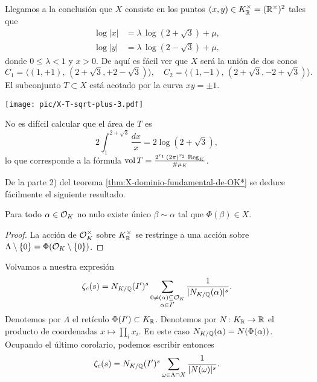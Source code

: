 \begin{ejemplo}
  \vspace{1em}

  Llegamos a la conclusión que $X$ consiste en los puntos
  $(x,y) \in K_{\mathbb{R}}^\times = (\mathbb{R}^\times)^2$ tales que
  \begin{align*}
    \log |x| & = \lambda\,\log (2 + \sqrt{3}) + \mu,\\
    \log |y| & = \lambda\,\log (2 - \sqrt{3}) + \mu,
  \end{align*}
  donde $0 \le \lambda < 1$ y $x > 0$. De aquí es fácil ver que $X$ será la
  unión de dos conos
  \[ C_1 = \langle (1,+1), \, (2 + \sqrt{3}, +2 - \sqrt{3}) \rangle, \quad
     C_2 = \langle (1,-1), \, (2 + \sqrt{3}, -2 + \sqrt{3}) \rangle. \]
  El subconjunto $T \subset X$ está acotado por la curva $xy = \pm 1$.

  \begin{center}
    \texttt{[image: pic/X-T-sqrt-plus-3.pdf]}
  \end{center}

  No es difícil calcular que el área de $T$ es
  $$2\int_1^{2 + \sqrt{3}} \frac{dx}{x} = 2\log (2 + \sqrt{3}),$$
  lo que corresponde a la fórmula
  $\operatorname{vol} T = \frac{2^{r_1}\,(2\pi)^{r_2}\,\operatorname{Reg}_K}{\#\mu_K}$.
\end{ejemplo}

De la parte 2) del teorema \ref{thm:X-dominio-fundamental-de-OK*} se deduce
fácilmente el siguiente resultado.

\begin{corolario}
  Para todo $\alpha \in \mathcal{O}_K$ no nulo existe único $\beta \sim \alpha$ tal que
  $\Phi (\beta) \in X$.

  \begin{proof}
    La acción de $\mathcal{O}_K^\times$ sobre $K_{\mathbb{R}}^\times$ se restringe a una acción
    sobre $\Lambda\setminus \{ 0 \} = \Phi (\mathcal{O}_K \setminus \{ 0 \})$.
  \end{proof}
\end{corolario}

Volvamos a nuestra expresión
$$\zeta_c (s) = N_{K/\mathbb{Q}} (I')^s \sum_{\substack{0 \ne (\alpha) \subseteq \mathcal{O}_K \\ \alpha \in I'}} \frac{1}{|N_{K/\mathbb{Q}} (\alpha)|^s}.$$
Denotemos por $\Lambda$ el retículo $\Phi (I') \subset K_{\mathbb{R}}$. Denotemos por
$N\colon K_{\mathbb{R}} \to \mathbb{R}$ el producto de coordenadas $x \mapsto \prod_i x_i$.
En este caso $N_{K/\mathbb{Q}} (\alpha) = N (\Phi (\alpha))$. Ocupando el último
corolario, podemos escribir entonces
$$\zeta_c (s) = N_{K/\mathbb{Q}} (I')^s \sum_{\omega \in \Lambda \cap X} \frac{1}{|N (\omega)|^s}.$$

